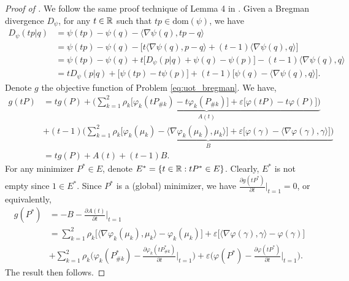 \begin{proof}[Proof of ]
We follow the same proof technique of Lemma 4 in \citep{Khiem20}.
Given a Bregman divergence $D_{\psi}$, for any $t \in \mathbb R$ such that $tp \in \text{dom}(\psi)$,
we have
\begin{align}
  D_{\psi}(t p | q)
  &= \psi(tp) - \psi(q) - \langle \nabla \psi(q), tp - q \rangle \\
  &= \psi(tp) - \psi(q) - \Big[
    t \langle \nabla \psi(q), p - q \rangle + (t-1) \langle \nabla \psi(q), q \rangle
  \Big] \\
  &= \psi(tp) - \psi(q) + t \Big[ D_{\psi}(p | q) + \psi(q) - \psi(p) \Big]
  - (t-1) \langle \nabla \psi(q), q \rangle \\
  &= t D_{\psi}(p | q) + \big[ \psi(tp) - t \psi(p) \big]
  + (t-1) \big[ \psi(q) - \langle \nabla \psi(q), q \rangle \big].
\end{align}
Denote $g$ the objective function of Problem \eqref{eq:uot_bregman}. We have,
\begin{align}
  g(tP) &= t g(P) +
  \underbrace{\Big( \sum_{k=1}^2 \rho_k \big[ \varphi_k(tP_{\# k}) - t \varphi_k(P_{\# k}) \big]
  + \varepsilon \big[ \varphi(tP) - t \varphi(P) \big] \Big)}_{A(t)} \\
  &+ (t-1) \underbrace{\Big(
    \sum_{k=1}^2 \rho_k \big[ \varphi_k(\mu_k) - \langle \nabla \varphi_k(\mu_k), \mu_k \rangle \big]
    + \varepsilon \big[ \varphi(\gamma) - \langle \nabla \varphi(\gamma), \gamma \rangle \big]
    \Big)}_{B} \\
    &= t g(P) + A(t) + (t-1) B.
\end{align}
For any minimizer $P^* \in E$, denote $E^* =\{ t \in \mathbb R: tP^* \in E \}$. Clearly,
$E^*$ is not empty since $1 \in E^*$. Since $P^*$ is a (global) minimizer, we have
$\frac{\partial g(tP^*)}{\partial t} \Big |_{t = 1} = 0$,
or equivalently,
\begin{align}
  g(P^*) &= - B - \frac{\partial A(t)}{\partial t} \bigg|_{t=1} \\
  &= \sum_{k=1}^2 \rho_k \Big[ \langle \nabla \varphi_k(\mu_k), \mu_k \rangle - \varphi_k(\mu_k) \Big]
  + \varepsilon \Big[ \langle \nabla \varphi(\gamma), \gamma \rangle - \varphi(\gamma) \Big] \\
  &+ \sum_{k=1}^2
  \rho_k \Bigg( \varphi_k(P^*_{\# k}) - \frac{\partial \varphi_k(tP^*_{\# k})}{\partial t} \bigg|_{t=1} \Bigg)
  + \varepsilon \Bigg( \varphi(P^*) - \frac{\partial \varphi(tP^*)}{\partial t} \bigg|_{t=1} \Bigg).
\end{align}
The result then follows.
\end{proof}

